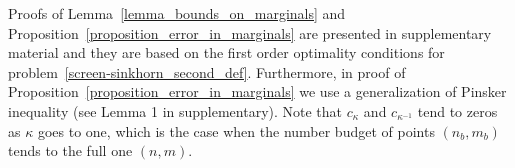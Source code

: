 Proofs of Lemma~\ref{lemma_bounds_on_marginals} and Proposition~\ref{proposition_error_in_marginals} are presented in supplementary material and they are based on the first order optimality conditions for problem~\eqref{screen-sinkhorn_second_def}. 
Furthermore, in proof of Proposition~\ref{proposition_error_in_marginals} we use a generalization of Pinsker inequality (see Lemma 1 in supplementary). 
Note that $c_\kappa$ and $c_{\kappa^{-1}}$ tend to zeros as $\kappa$ goes to one, which is the case when the number budget of points $(n_b,m_b)$ tends to the full one $(n,m)$.

